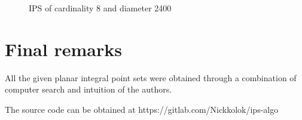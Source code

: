 \documentclass[12pt]{article}
\theoremstyle{theorem}
\theoremstyle{dfn}
\theoremstyle{remark}
\begin{document}
\begin{figure}[h!]
	\parbox{1\linewidth}{\caption{IPS of cardinality 8 and diameter 2400}
	\label{8_2400_42_56f3}}
\end{figure}



\section{Final remarks}
All the given planar integral point sets were obtained through a combination of computer search and intuition of the authors.

The source code can be obtained at https://gitlab.com/Nickkolok/ips-algo

\end{document}
